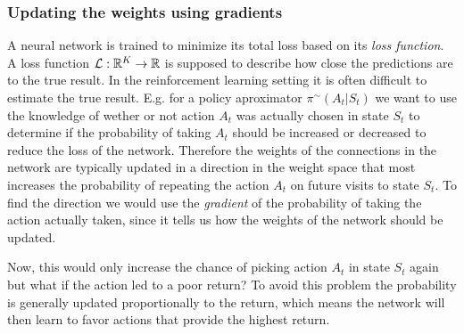 \documentclass[11pt]{article}
\begin{document}
\subsubsection{Updating the weights using gradients}

A neural network is trained to minimize its total loss based on its \textit{loss
function}.
A loss function $\mathcal{L} : \mathbb{R}^K \to \mathbb{R}$ is supposed to describe how close the
predictions are to the true result.
In the reinforcement learning setting it is often difficult to estimate the
true result.
E.g. for a policy aproximator $\pi^{\sim}(A_t | S_t)$ we want to use the knowledge
of wether or not action $A_t$ was actually chosen in state $S_t$ to determine
if the probability of taking $A_t$ should be increased or decreased to
reduce the loss of the network.
Therefore the weights of the connections in the network are typically updated
in a direction in the weight space
that most increases the probability of repeating the action $A_t$ on future visits to
state $S_t$\cite{RLbook}. 
To find the direction we would use the \textit{gradient} of the probability of
taking the action actually taken, since it tells us how the weights of the network
should be updated.

Now, this would only increase the chance of picking action $A_t$ in state $S_t$ again
but what if the action led to a poor return?
To avoid this problem the probability is generally updated proportionally to the
return, which means the network will then learn to favor actions that provide
the highest return.
\end{document}
